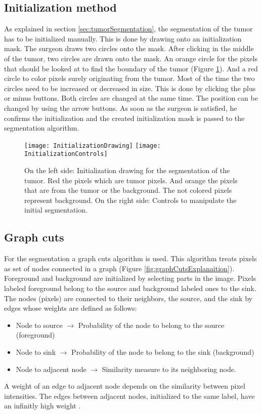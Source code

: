 \subsection{Initialization method}
As explained in section \ref{sec:tumorSegmentation}, the segmentation of the
tumor has to be initialized manually. This is done by drawing onto an
initialization mask. The surgeon draws two circles onto the mask. After clicking in the middle of the tumor, two
circles are drawn onto the mask. An orange
circle for the pixels that should be looked at to find the boundary of the
tumor (Figure \ref{fig:InitializeGraphCut}). And a red circle to color pixels surely
originating from the tumor. Most of the time the two circles need to be
increased or decreased in size. This is done by clicking the plus or minus
buttons. Both circles are changed at the same time. The position can be changed
by using the arrow buttons. As soon as the surgeon is satisfied, he confirms the
initialization and the created initialization mask is passed to the segmentation algorithm.
\begin{figure}[H]
  \centering
  \texttt{[image: InitializationDrawing]}
  \endminipage
  \hfill
  \texttt{[image: InitializationControls]}
  \endminipage
  \hfill
  \caption{On the left side: Initialization drawing for the segmentation of the
    tumor. Red the pixels which are tumor pixels. And orange the pixels that are
    from the tumor or the background. The not colored pixels represent
    background. On the right side: Controls to manipulate the initial segmentation.}
  \label{fig:InitializeGraphCut}
\end{figure}

\subsection{Graph cuts}
For the segmentation a graph cuts algorithm is used. This algorithm treats
pixels as set of nodes connected in a graph (Figure
\ref{fig:graphCutsExplanaition}). Foreground and background are initialized by
selecting parts in the image.
Pixels labeled foreground belong to the source and
background labeled ones to the sink. The nodes (pixels) are connected to their
neighbors, the source, and the sink by
edges whose weights are defined as follows:
\begin{itemize}
  \item Node to source $\rightarrow$ Probability of the node to belong to the source (foreground)
  \item Node to sink $\rightarrow$ Probability of the node to belong to the sink (background)
  \item Node to adjacent node $\rightarrow$ Similarity measure to its neighboring node. 
\end{itemize}
A weight of an edge to adjacent node depends on the similarity between pixel intensities.
The edges between adjacent nodes, initialized to the same label, have an
infinitly high weight \cite{wiki:MaxFlow}.

